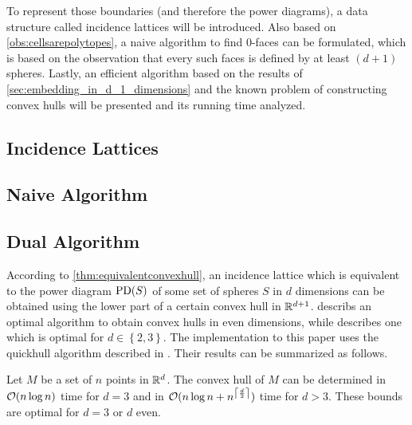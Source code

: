 To represent those boundaries (and therefore the power diagrams), a data structure called incidence lattices will be introduced.
Also based on \cref{obs:cellsarepolytopes}, a naive algorithm to find $0$-faces can be formulated, which is based on the observation that every such faces is defined by at least $(d+1)$ spheres.
Lastly, an efficient algorithm based on the results of \cref{sec:embedding_in_d_1_dimensions} and the known problem of constructing convex hulls will be presented and its running time analyzed.

\subsection{Incidence Lattices}
\label{sub:incidence_lattices}

\subsection{Naive Algorithm}
\label{sub:naive_algorithm}

\subsection{Dual Algorithm}
\label{sub:dual_algorithm}
According to \cref{thm:equivalentconvexhull}, an incidence lattice which is equivalent to the power diagram $\operatorname{PD}(S)$ of some set of spheres $S$ in $d$ dimensions can be obtained using the lower part of a certain convex hull in $\mathbb{R}^{d+1}$.
\cite{seidel1981convex} describs an optimal algorithm to obtain convex hulls in even dimensions, while \cite{preparata1977convex} describes one which is optimal for $d \in \left\{ 2, 3 \right\}$.
The implementation to this paper uses the quickhull algorithm described in \cite{barber1996quickhull}.
Their results can be summarized as follows.
\begin{lemma}
    \label{lem:convexhulls}
    Let $M$ be a set of $n$ points in $\mathbb{R}^d$.
    The convex hull of $M$ can be determined in $\mathcal{O}(n \log n)$ time for $d = 3$ and in $\mathcal{O}(n \log n + n^{\left\lceil\frac{d}{2}\right\rceil})$ time for $d > 3$.
    These bounds are optimal for $d = 3$ or $d$ even.
\end{lemma}

